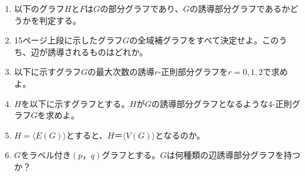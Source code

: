 
\begin{enumerate}
  \item 以下のグラフ$H$と$F$は$G$の部分グラフであり、$G$の誘導部分グラフであるかどうかを判定する。
  \item 15ページ上段に示したグラフ$G$の全域補グラフをすべて決定せよ。このうち、辺が誘導されるものはどれか。
  \item 以下に示すグラフ$G$の最大次数の誘導$r$-正則部分グラフを$r = 0, 1, 2$で求めよ。
  \item $H$を以下に示すグラフとする。$H$が$G$の誘導部分グラフとなるような4-正則グラフ$G$を求めよ。
  \item $H=\langle E(G)\rangle $とすると、$H＝\langle V(G)\rangle $となるのか。
  \item $G$をラベル付き$(p，q)$グラフとする。$G$は何種類の辺誘導部分グラフを持つか？
\end{enumerate}